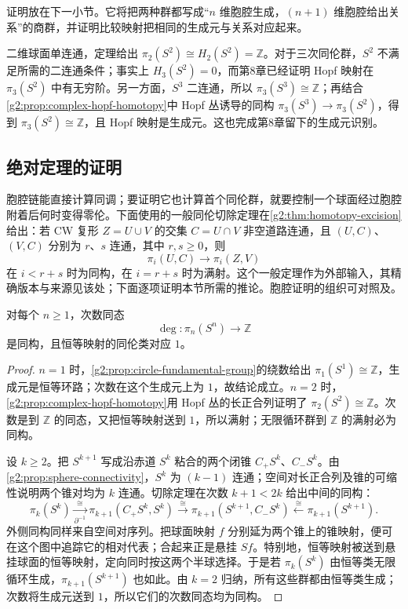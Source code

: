 证明放在下一小节。它将把两种群都写成“\(n\) 维胞腔生成，\((n+1)\) 维胞腔给出关系”的商群，并证明比较映射把相同的生成元与关系对应起来。

\begin{example}\label{g2:exm:hurewicz-first-degree}
	二维球面单连通，定理给出 \(\pi_2(S^2)\cong H_2(S^2)=\mathbb Z\)。对于三次同伦群，\(S^2\) 不满足所需的二连通条件；事实上 \(H_3(S^2)=0\)，而第8章已经证明 Hopf 映射在 \(\pi_3(S^2)\) 中有无穷阶。另一方面，\(S^3\) 二连通，所以 \(\pi_3(S^3)\cong\mathbb Z\)；再结合\cref{g2:prop:complex-hopf-homotopy}中 Hopf 丛诱导的同构 \(\pi_3(S^3)\to\pi_3(S^2)\)，得到 \(\pi_3(S^2)\cong\mathbb Z\)，且 Hopf 映射是生成元。这也完成第8章留下的生成元识别。
\end{example}

\subsection{绝对定理的证明}
\label{g2:subsec:0902:03}

胞腔链能直接计算同调；要证明它也计算首个同伦群，就要控制一个球面经过胞腔附着后何时变得零伦。下面使用的一般同伦切除定理在\cref{g2:thm:homotopy-excision}给出：若 CW 复形 \(Z=U\cup V\) 的交集 \(C=U\cap V\) 非空道路连通，且 \((U,C)\)、\((V,C)\) 分别为 \(r\)、\(s\) 连通，其中 \(r,s\ge0\)，则
\[
	\pi_i(U,C)\longrightarrow\pi_i(Z,V)
\]
在 \(i<r+s\) 时为同构，在 \(i=r+s\) 时为满射。这个一般定理作为外部输入，其精确版本与来源见该处；下面逐项证明本节所需的推论。胞腔证明的组织可对照\cite[第4.2节，Excision for Homotopy Groups]{Hatcher2002}及\cite[第15章，第1节]{May1999}。

\begin{lemma}\label{g2:lem:sphere-degree-classification}
	对每个 \(n\ge1\)，次数同态
	\[
		\deg:\pi_n(S^n)\longrightarrow\mathbb Z
	\]
	是同构，且恒等映射的同伦类对应 \(1\)。
\end{lemma}
\begin{proof}
	\(n=1\) 时，\cref{g2:prop:circle-fundamental-group}的绕数给出 \(\pi_1(S^1)\cong\mathbb Z\)，生成元是恒等环路；次数在这个生成元上为 \(1\)，故结论成立。\(n=2\) 时，\cref{g2:prop:complex-hopf-homotopy}用 Hopf 丛的长正合列证明了 \(\pi_2(S^2)\cong\mathbb Z\)。次数是到 \(\mathbb Z\) 的同态，又把恒等映射送到 \(1\)，所以满射；无限循环群到 \(\mathbb Z\) 的满射必为同构。

	设 \(k\ge2\)。把 \(S^{k+1}\) 写成沿赤道 \(S^k\) 粘合的两个闭锥 \(C_+S^k\)、\(C_-S^k\)。由\cref{g2:prop:sphere-connectivity}，\(S^k\) 为 \((k-1)\) 连通；空间对长正合列及锥的可缩性说明两个锥对均为 \(k\) 连通。切除定理在次数 \(k+1<2k\) 给出中间的同构：
	\[
		\pi_k(S^k)\xrightarrow[\partial^{-1}]{\ \cong\ }
		\pi_{k+1}(C_+S^k,S^k)
		\xrightarrow{\ \cong\ }
		\pi_{k+1}(S^{k+1},C_-S^k)
		\xleftarrow{\ \cong\ }\pi_{k+1}(S^{k+1}).
	\]
	外侧同构同样来自空间对序列。把球面映射 \(f\) 分别延为两个锥上的锥映射，便可在这个图中追踪它的相对代表；合起来正是悬挂 \(Sf\)。特别地，恒等映射被送到悬挂球面的恒等映射，定向同时按这两个半球选择。于是若 \(\pi_k(S^k)\) 由恒等类无限循环生成，\(\pi_{k+1}(S^{k+1})\) 也如此。由 \(k=2\) 归纳，所有这些群都由恒等类生成；次数将生成元送到 \(1\)，所以它们的次数同态均为同构。
\end{proof}


